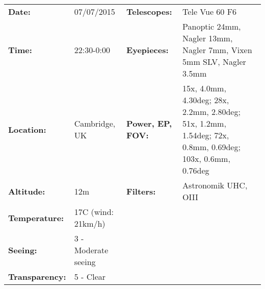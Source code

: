 \begin{tabular}{ p{0.9in} p{1.3in} p{1.2in} p{5.2in}}
{\bf Date:} & 07/07/2015 & {\bf Telescopes:} & Tele Vue 60 F6 \\ 
{\bf Time:} & 22:30-0:00 & {\bf Eyepieces:} & Panoptic 24mm, Nagler 13mm, Nagler 7mm, Vixen 5mm SLV, Nagler 3.5mm \\ 
{\bf Location:} & Cambridge, UK & {\bf Power, EP, FOV:} & 15x, 4.0mm, 4.30deg; 28x, 2.2mm, 2.80deg; 51x, 1.2mm, 1.54deg; 72x, 0.8mm, 0.69deg; 103x, 0.6mm, 0.76deg \\ 
{\bf Altitude:} & 12m & {\bf Filters:} & Astronomik UHC, OIII \\ 
{\bf Temperature:} & 17C (wind: 21km/h) & & \\ 
{\bf Seeing:} & 3 - Moderate seeing & & \\ 
{\bf Transparency:} & 5 - Clear & & \\ 
\end{tabular}
